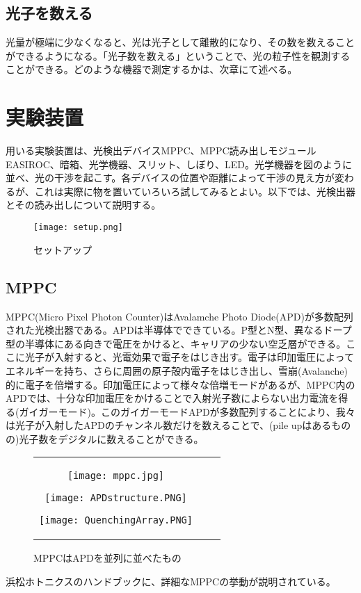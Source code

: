 \documentclass[10pt,a4j]{jarticle}
\begin{document}
\subsection{光子を数える}
光量が極端に少なくなると、光は光子として離散的になり、その数を数えることができるようになる。「光子数を数える」ということで、光の粒子性を観測することができる。どのような機器で測定するかは、次章にて述べる。


\section{実験装置}
用いる実験装置は、光検出デバイスMPPC、MPPC読み出しモジュールEASIROC、暗箱、光学機器、スリット、しぼり、LED。光学機器を図のように並べ、光の干渉を起こす。各デバイスの位置や距離によって干渉の見え方が変わるが、これは実際に物を置いていろいろ試してみるとよい。以下では、光検出器とその読み出しについて説明する。
\begin{figure}[h]
\begin{center}
\texttt{[image: setup.png]}
\end{center}
\caption{セットアップ}
\end{figure}
\subsection{MPPC}
MPPC(Micro Pixel Photon Counter)はAvalamche Photo Diode(APD)が多数配列された光検出器である。APDは半導体でできている。P型とN型、異なるドープ型の半導体にある向きで電圧をかけると、キャリアの少ない空乏層ができる。ここに光子が入射すると、光電効果で電子をはじき出す。電子は印加電圧によってエネルギーを持ち、さらに周囲の原子殻内電子をはじき出し、雪崩(Avalanche)的に電子を倍増する。印加電圧によって様々な倍増モードがあるが、MPPC内のAPDでは、十分な印加電圧をかけることで入射光子数によらない出力電流を得る(ガイガーモード)。このガイガーモードAPDが多数配列することにより、我々は光子が入射したAPDのチャンネル数だけを数えることで、(pile upはあるものの)光子数をデジタルに数えることができる。
\begin{figure}[h]
\begin{tabular}{ccc}
\begin{minipage}[t]{0.33\hsize}
\begin{center}
\texttt{[image: mppc.jpg]}
\end{center}
\caption{MPPC}
\end{minipage}
\begin{minipage}[t]{0.33\hsize}
\begin{center}
\texttt{[image: APDstructure.PNG]}
\end{center}
\caption{APD}
\end{minipage}
\begin{minipage}[t]{0.33\hsize}
\begin{center}
\texttt{[image: QuenchingArray.PNG]}
\end{center}
\caption{MPPCはAPDを並列に並べたもの}
\end{minipage}
\end{tabular}
\end{figure}
浜松ホトニクスのハンドブックに、詳細なMPPCの挙動が説明されている。\cite{hamamatsu}
\end{document}
